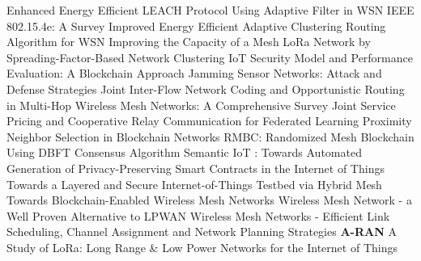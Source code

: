  \cite{kaur_enhanced_2018} Enhanced {{Energy Efficient LEACH Protocol Using Adaptive Filter}} in {{WSN}} \newline 
 \cite{de_guglielmo_ieee_2016} {{IEEE}} 802.15.4e: {{A}} Survey \newline 
 \cite{song_improved_2018} Improved {{Energy Efficient Adaptive Clustering Routing Algorithm}} for {{WSN}} \newline 
 \cite{zhu_improving_2019} Improving the {{Capacity}} of a {{Mesh LoRa Network}} by {{Spreading}}-{{Factor}}-{{Based Network Clustering}} \newline 
 \cite{wang_iot_2018} {{IoT Security Model}} and {{Performance Evaluation}}: {{A Blockchain Approach}} \newline 
 \cite{xu_jamming_2006} Jamming Sensor Networks: Attack and Defense Strategies \newline 
 \cite{kafaie_joint_2018} Joint {{Inter}}-{{Flow Network Coding}} and {{Opportunistic Routing}} in {{Multi}}-{{Hop Wireless Mesh Networks}}: {{A Comprehensive Survey}} \newline 
 \cite{feng_joint_2019} Joint {{Service Pricing}} and {{Cooperative Relay Communication}} for {{Federated Learning}} \newline 
 \cite{aoki_proximity_2019} Proximity {{Neighbor Selection}} in {{Blockchain Networks}} \newline 
 \cite{jeon_rmbc_2018} {{RMBC}}: {{Randomized}} Mesh Blockchain Using {{DBFT}} Consensus Algorithm \newline 
 \cite{panetto_semantic_2018} Semantic {{IoT }}: {{Towards Automated Generation}} of {{Privacy}}-{{Preserving Smart Contracts}} in the {{Internet}} of {{Things}} \newline 
 \cite{jones_layered_2018} Towards a {{Layered}} and {{Secure Internet}}-of-{{Things Testbed}} via {{Hybrid Mesh}} \newline 
 \cite{selimi_towards_2018} Towards {{Blockchain}}-Enabled {{Wireless Mesh Networks}} \newline 
 \cite{noauthor_wireless_2017} Wireless {{Mesh Network}} - a Well Proven Alternative to {{LPWAN}} \newline 
 \cite{krendzel_wireless_2012} Wireless {{Mesh Networks}} - {{Efficient Link Scheduling}}, {{Channel Assignment}} and {{Network Planning Strategies}} \newline 
\textbf{A-RAN} \newline  \cite{augustin_study_2016} A {{Study}} of {{LoRa}}: {{Long Range}} \& {{Low Power Networks}} for the {{Internet}} of {{Things}} \newline 
